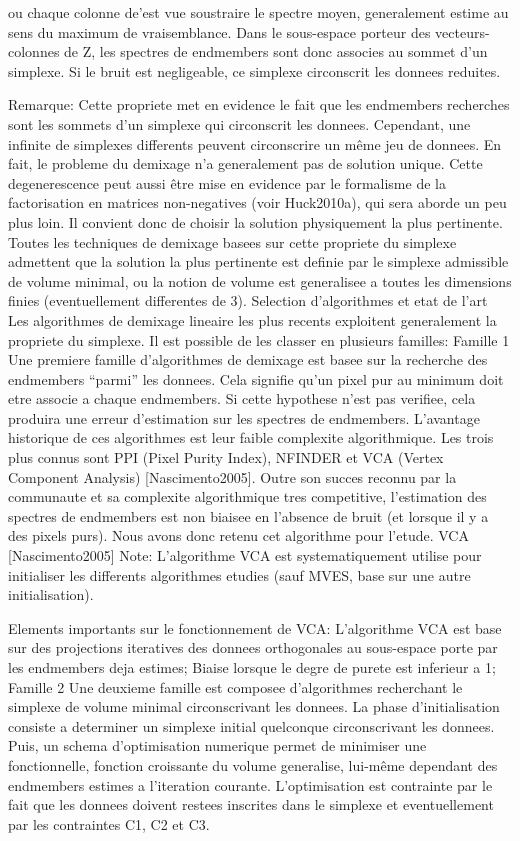 ou chaque colonne de'est vue soustraire le spectre moyen,
generalement estime au sens du maximum de vraisemblance. Dans le
sous-espace porteur des vecteurs-colonnes de Z, les spectres de
endmembers sont donc associes au sommet d'un simplexe. Si le bruit est
negligeable, ce simplexe circonscrit les donnees reduites.

Remarque: Cette propriete met en evidence le fait que les endmembers
recherches sont les sommets d'un simplexe qui circonscrit les
donnees. Cependant, une infinite de simplexes differents peuvent
circonscrire un même jeu de donnees. En fait, le probleme du demixage
n'a generalement pas de solution unique. Cette degenerescence peut
aussi être mise en evidence par le formalisme de la factorisation en
matrices non-negatives (voir Huck2010a), qui sera aborde un peu plus
loin. Il convient donc de choisir la solution physiquement la plus
pertinente. Toutes les techniques de demixage basees sur cette
propriete du simplexe admettent que la solution la plus pertinente est
definie par le simplexe admissible de volume minimal, ou la notion de
volume est generalisee a toutes les dimensions finies (eventuellement
differentes de 3).  Selection d'algorithmes et etat de l'art Les
algorithmes de demixage lineaire les plus recents exploitent
generalement la propriete du simplexe. Il est possible de les classer
en plusieurs familles: 
Famille 1 Une premiere famille d'algorithmes
de demixage est basee sur la recherche des endmembers ``parmi'' les
donnees. Cela signifie qu'un pixel pur au minimum doit etre associe a
chaque endmembers. Si cette hypothese n'est pas verifiee, cela
produira une erreur d'estimation sur les spectres de
endmembers. L'avantage historique de ces algorithmes est leur faible
complexite algorithmique. Les trois plus connus sont PPI (Pixel Purity
Index), NFINDER et VCA (Vertex Component Analysis)
[Nascimento2005]. Outre son succes reconnu par la communaute et sa
complexite algorithmique tres competitive, l'estimation des spectres
de endmembers est non biaisee en l'absence de bruit (et lorsque il y a
des pixels purs). Nous avons donc retenu cet algorithme pour l'etude.
VCA [Nascimento2005] 
Note: L'algorithme VCA est systematiquement
utilise pour initialiser les differents algorithmes etudies (sauf
MVES, base sur une autre initialisation).

Elements importants sur le fonctionnement de VCA: L'algorithme VCA
est base sur des projections iteratives des donnees orthogonales au
sous-espace porte par les endmembers deja estimes; Biaise lorsque le
degre de purete est inferieur a 1; Famille 2 Une deuxieme famille est
composee d'algorithmes recherchant le simplexe de volume minimal
circonscrivant les donnees. La phase d'initialisation consiste a
determiner un simplexe initial quelconque circonscrivant les
donnees. Puis, un schema d'optimisation numerique permet de minimiser
une fonctionnelle, fonction croissante du volume generalise, lui-même
dependant des endmembers estimes a l'iteration
courante. L'optimisation est contrainte par le fait que les donnees
doivent restees inscrites dans le simplexe et eventuellement par les
contraintes C1, C2 et C3.

